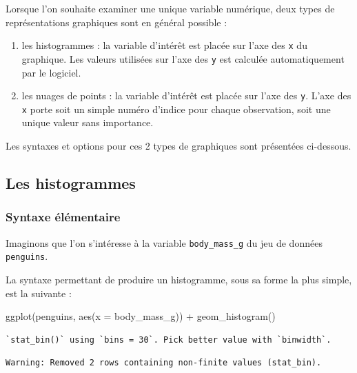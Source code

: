 \documentclass[
  letterpaper,
  DIV=11,
  numbers=noendperiod]{scrreprt}
\newenvironment{Shaded}{\begin{snugshade}}{\end{snugshade}}
\newcommand{\AttributeTok}[1]{\textcolor[rgb]{0.40,0.45,0.13}{#1}}
\newcommand{\FunctionTok}[1]{\textcolor[rgb]{0.28,0.35,0.67}{#1}}
\newcommand{\NormalTok}[1]{\textcolor[rgb]{0.00,0.23,0.31}{#1}}
\newcommand{\SpecialCharTok}[1]{\textcolor[rgb]{0.37,0.37,0.37}{#1}}
\providecommand{\tightlist}{%
  \setlength{\itemsep}{0pt}\setlength{\parskip}{0pt}}\usepackage{longtable,booktabs,array}
\begin{document}
Lorsque l'on souhaite examiner une unique variable numérique, deux types
de représentations graphiques sont en général possible :

\begin{enumerate}
\def\labelenumi{\arabic{enumi}.}
\tightlist
\item
  les histogrammes : la variable d'intérêt est placée sur l'axe des
  \texttt{x} du graphique. Les valeurs utilisées sur l'axe des
  \texttt{y} est calculée automatiquement par le logiciel.
\item
  les nuages de points : la variable d'intérêt est placée sur l'axe des
  \texttt{y}. L'axe des \texttt{x} porte soit un simple numéro d'indice
  pour chaque observation, soit une unique valeur sans importance.
\end{enumerate}

Les syntaxes et options pour ces 2 types de graphiques sont présentées
ci-dessous.

\hypertarget{les-histogrammes}{%
\subsection{Les histogrammes}\label{les-histogrammes}}

\hypertarget{syntaxe-uxe9luxe9mentaire}{%
\subsubsection{Syntaxe élémentaire}\label{syntaxe-uxe9luxe9mentaire}}

Imaginons que l'on s'intéresse à la variable \texttt{body\_mass\_g} du
jeu de données \texttt{penguins}.

La syntaxe permettant de produire un histogramme, sous sa forme la plus
simple, est la suivante :

\begin{Shaded}
\begin{Highlighting}[]
\FunctionTok{ggplot}\NormalTok{(penguins, }\FunctionTok{aes}\NormalTok{(}\AttributeTok{x =}\NormalTok{ body\_mass\_g)) }\SpecialCharTok{+}
  \FunctionTok{geom\_histogram}\NormalTok{()}
\end{Highlighting}
\end{Shaded}

\begin{verbatim}
`stat_bin()` using `bins = 30`. Pick better value with `binwidth`.
\end{verbatim}

\begin{verbatim}
Warning: Removed 2 rows containing non-finite values (stat_bin).
\end{verbatim}
\end{document}
